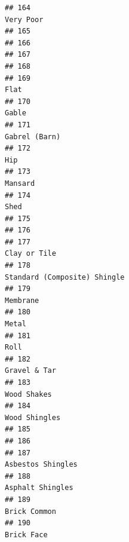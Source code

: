 \documentclass[
]{article}
\begin{document}
\begin{verbatim}
## 164                                                                                  Very Poor
## 165                                                                                           
## 166                                                                                           
## 167                                                                                           
## 168                                                                                           
## 169                                                                                       Flat
## 170                                                                                      Gable
## 171                                                                              Gabrel (Barn)
## 172                                                                                        Hip
## 173                                                                                    Mansard
## 174                                                                                       Shed
## 175                                                                                           
## 176                                                                                           
## 177                                                                               Clay or Tile
## 178                                                               Standard (Composite) Shingle
## 179                                                                                   Membrane
## 180                                                                                      Metal
## 181                                                                                       Roll
## 182                                                                               Gravel & Tar
## 183                                                                                Wood Shakes
## 184                                                                              Wood Shingles
## 185                                                                                           
## 186                                                                                           
## 187                                                                          Asbestos Shingles
## 188                                                                           Asphalt Shingles
## 189                                                                               Brick Common
## 190                                                                                 Brick Face

\end{verbatim}
\end{document}
